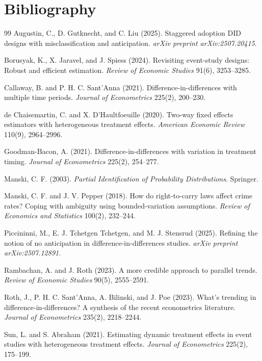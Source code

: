 \documentclass[11pt]{article}
\theoremstyle{definition}
\theoremstyle{plain}
\theoremstyle{remark}
\begin{document}
\section*{Bibliography}
\begin{thebibliography}{99}
Augustin, C., D. Gutknecht, and C. Liu (2025).
\newblock Staggered adoption DID designs with misclassification and anticipation.
\newblock \emph{arXiv preprint arXiv:2507.20415}.

Borusyak, K., X. Jaravel, and J. Spiess (2024).
\newblock Revisiting event-study designs: Robust and efficient estimation.
\newblock \emph{Review of Economic Studies} 91(6), 3253--3285.

Callaway, B. and P. H. C. Sant'Anna (2021).
\newblock Difference-in-differences with multiple time periods.
\newblock \emph{Journal of Econometrics} 225(2), 200--230.

de Chaisemartin, C. and X. D'Haultfoeuille (2020).
\newblock Two-way fixed effects estimators with heterogeneous treatment effects.
\newblock \emph{American Economic Review} 110(9), 2964--2996.

Goodman-Bacon, A. (2021).
\newblock Difference-in-differences with variation in treatment timing.
\newblock \emph{Journal of Econometrics} 225(2), 254--277.

Manski, C. F. (2003).
\newblock \emph{Partial Identification of Probability Distributions}.
\newblock Springer.

Manski, C. F. and J. V. Pepper (2018).
\newblock How do right-to-carry laws affect crime rates? Coping with ambiguity using bounded-variation assumptions.
\newblock \emph{Review of Economics and Statistics} 100(2), 232--244.

Piccininni, M., E. J. Tchetgen Tchetgen, and M. J. Stensrud (2025).
\newblock Refining the notion of no anticipation in difference-in-differences studies.
\newblock \emph{arXiv preprint arXiv:2507.12891}.

Rambachan, A. and J. Roth (2023).
\newblock A more credible approach to parallel trends.
\newblock \emph{Review of Economic Studies} 90(5), 2555--2591.

Roth, J., P. H. C. Sant'Anna, A. Bilinski, and J. Poe (2023).
\newblock What's trending in difference-in-differences? A synthesis of the recent econometrics literature.
\newblock \emph{Journal of Econometrics} 235(2), 2218--2244.

Sun, L. and S. Abraham (2021).
\newblock Estimating dynamic treatment effects in event studies with heterogeneous treatment effects.
\newblock \emph{Journal of Econometrics} 225(2), 175--199.
\end{thebibliography}
\end{document}
